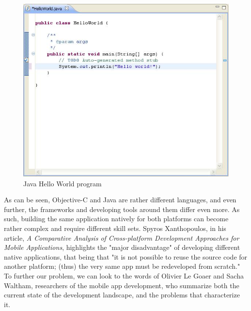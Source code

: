 \documentclass[11pt, twocolumn]{article}
\begin{document}
\begin{figure}[h!]
\includegraphics[scale=0.5]{java-hello-world}
\caption{Java Hello World program ~\cite{Made-Easy.com}}
\end{figure}

As can be seen, Objective-C and Java are rather different languages, and even further, the frameworks and developing tools around them differ even more.  As such, building the same application natively for both platforms can become rather complex and require different skill sets.  Spyros Xanthopoulos, in his article, {\it A Comparative Analysis of Cross-platform Development Approaches for Mobile Applications}, highlights the "major disadvantage" of developing different native applications, that being that "it is not possible to reuse the source code for another platform; (thus) the very same app must be redeveloped from scratch."~\cite{Xanthopoulos2013}  To further our problem, we can look to the words of Olivier Le Goaer and Sacha Waltham, researchers of the mobile app development, who summarize both the current state of the development landscape, and the problems that characterize it.
\end{document}
